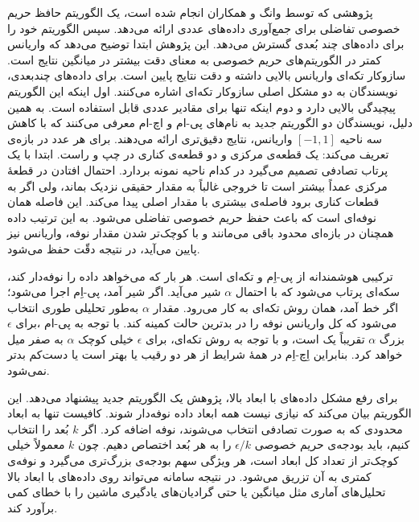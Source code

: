 
پژوهشی که توسط وانگ و همکاران  انجام شده است، یک الگوریتم حافظ حریم خصوصی تفاضلی برای جمع‌آوری داده‌های عددی ارائه می‌دهد. سپس الگوریتم خود را برای داده‌های چند بُعدی گسترش می‌دهد. این پژوهش ابتدا توضیح می‌دهد که واریانس کمتر در الگوریتم‌های حریم خصوصی به معنای دقت بیشتر در میانگین نتایج است. سازوکار تکه‌ای  واریانس بالایی داشته و دقت نتایج پایین است. برای داده‌های چندبعدی، نویسندگان به دو مشکل اصلی سازوکار تکه‌ای اشاره می‌کنند. اول اینکه این الگوریتم پیچیدگی بالایی دارد و دوم اینکه تنها برای مقادیر عددی قابل استفاده است.
به همین دلیل، نویسندگان دو الگوریتم جدید به نام‌های پی‌-ام و اچ‌-ام معرفی می‌کنند که با کاهش واریانس، نتایج دقیق‌تری ارائه می‌دهند.  برای هر عدد در بازه‌ی ‎$[{-}1, 1]‎$ سه ناحیه تعریف می‌کند: یک قطعه‌ی مرکزی و دو قطعه‌ی کناری‌ در چپ و راست. ابتدا با یک پرتاب تصادفی تصمیم می‌گیرد در کدام ناحیه نمونه بردارد. احتمال افتادن در قطعهٔ مرکزی عمداً بیشتر است تا خروجی غالباً به مقدار حقیقی نزدیک بماند، ولی اگر به قطعات کناری برود فاصله‌ی بیشتری با مقدار اصلی پیدا می‌کند. این فاصله همان نوفه‌ای است که باعث حفظ حریم خصوصی تفاضلی می‌شود. به این ترتیب داده همچنان در بازه‌ای محدود باقی می‌مانند و با کوچک‌تر شدن مقدار نوفه، واریانس نیز پایین می‌آید، در نتیجه دقّت حفظ می‌شود.

 ترکیبی هوشمندانه از پی-اِم و تکه‌ای است. هر بار که می‌خواهد داده را نوفه‌دار کند، سکه‌ای پرتاب می‌شود که با احتمال $\alpha$ شیر می‌آید. اگر شیر آمد، پی-اِم اجرا می‌شود؛ اگر خط آمد، همان روش تکه‌ای به کار می‌رود. مقدار $\alpha$ به‌طور تحلیلی طوری انتخاب می‌شود که کل واریانس نوفه را در بدترین حالت کمینه کند. با توجه به پی-ام ،برای $\epsilon$ بزرگ $\alpha$ تقریباً یک است، و  با توجه به روش تکه‌ای، برای $\epsilon$ خیلی کوچک $\alpha$ به صفر میل خواهد کرد. بنابراین اِچ-اِم در همهٔ شرایط از هر دو رقیب یا بهتر است یا دست‌کم بدتر نمی‌شود.

برای رفع مشکل داده‌های با ابعاد بالا، پژوهش یک الگوریتم جدید پیشنهاد می‌دهد. این الگوریتم بیان می‌کند که نیازی نیست همه ابعاد داده نوفه‌دار شوند. کافیست تنها به ابعاد محدودی که به صورت تصادفی انتخاب می‌شوند، نوفه اضافه کرد. اگر $k$ بُعد را انتخاب کنیم، باید بودجه‌ی حریم خصوصی $\epsilon / k$ را به هر بُعد اختصاص دهیم. چون $k$ معمولاً خیلی کوچک‌تر از تعداد کل ابعاد است، هر ویژگی سهم بودجه‌ی بزرگ‌تری می‌گیرد و نوفه‌ی کمتری به آن تزریق می‌شود. در نتیجه سامانه می‌تواند روی داده‌های با ابعاد بالا تحلیل‌های آماری مثل میانگین یا حتی گرادیان‌های یادگیری ماشین را با خطای کمی برآورد کند.

